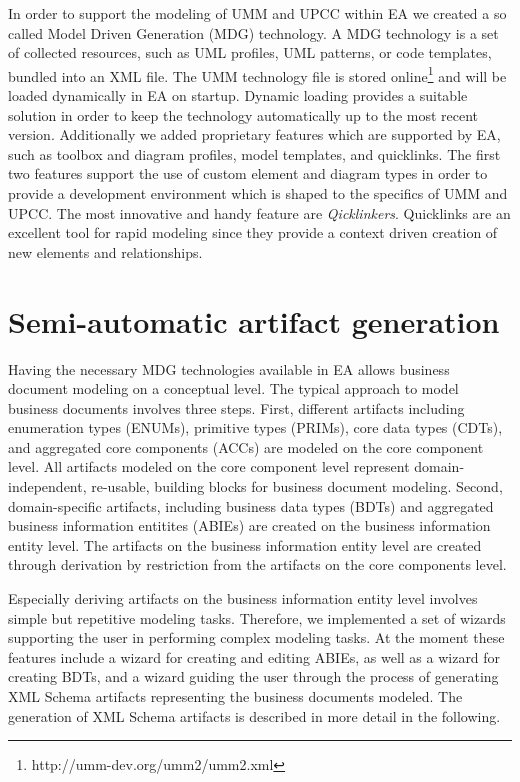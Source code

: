 \documentclass{acm_proc_article-sp}
\begin{document}
In order to support the modeling of UMM and UPCC within EA we created a so called Model Driven Generation (MDG) technology. A MDG technology is a set of collected resources, such as UML profiles, UML patterns, or code templates, bundled into an XML file. The UMM technology file is stored online\footnote{http://umm-dev.org/umm2/umm2.xml} and will be loaded dynamically in EA on startup. Dynamic loading provides a suitable solution in order to keep the technology automatically up to the most recent version. Additionally we added proprietary features which are supported by EA, such as toolbox and diagram profiles, model templates, and quicklinks. The first two features support the use of custom element and diagram types in order to provide a development environment which is shaped to the specifics of UMM and UPCC. The most innovative and handy feature are \textit{Qicklinkers}. Quicklinks are an excellent tool for rapid modeling since they provide a context driven creation of new elements and relationships. 

\section{Semi-automatic artifact generation}

Having the necessary MDG technologies available in EA allows business document modeling on a conceptual level. The typical approach to model business documents involves three steps. First, different artifacts including enumeration types (ENUMs), primitive types (PRIMs), core data types (CDTs), and aggregated core components (ACCs) are modeled on the core component level. All artifacts modeled on the core component level represent domain-independent, re-usable, building blocks for business document modeling. Second, domain-specific artifacts, including business data types (BDTs) and aggregated business information entitites (ABIEs) are created on the business information entity level. The artifacts on the business information entity level are created through derivation by restriction from the artifacts on the core components level. 

Especially deriving artifacts on the business information entity level involves simple but repetitive modeling tasks. Therefore, we implemented a set of wizards supporting the user in performing complex modeling tasks. At the moment these features include a wizard for creating and editing ABIEs, as well as a wizard for creating BDTs, and a wizard guiding the user through the process of generating XML Schema artifacts representing the business documents modeled. The generation of XML Schema artifacts is described in more detail in the following. 
\end{document}
